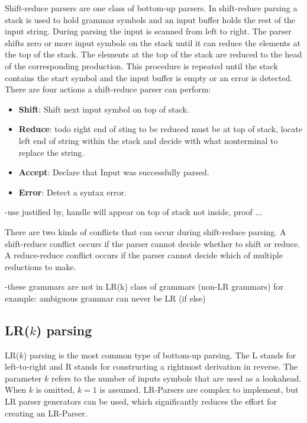 Shift-reduce parsers are one class of bottom-up parsers. In shift-reduce parsing a stack is used to hold grammar symbols and an input buffer holds the rest of the input string.
During parsing the input is scanned from left to right. The parser shifts zero or more input symbols on the stack until it can reduce the elements at the top of the stack. The elements at the top of the stack are reduced to the head of the corresponding production. This procedure is repeated until the stack contains the start symbol and the input buffer is empty or an error is detected. \cite{Aho.2007}\\
There are four actions a shift-reduce parser can perform:
\begin{itemize}%
	\item \textbf{Shift}: Shift next input symbol on top of stack.
	\item \textbf{Reduce}: todo right end of sting to be reduced must be at top of stack, locate left end of string within the stack and decide with what nonterminal to replace the string.
	\item \textbf{Accept}: Declare that Input was successfully parsed.
	\item \textbf{Error}: Detect a syntax error.
\end{itemize}
\cite{Aho.2007}

-use justified by, handle will appear on top of stack not inside, proof ...

There are two kinds of conflicts that can occur during shift-reduce parsing. A shift-reduce conflict occurs if the parser cannot decide whether to shift or reduce.
A reduce-reduce conflict occurs if the parser cannot decide which of multiple reductions to make.

-these grammars are not in LR(k) class of grammars (non-LR grammars)
for example: ambiguous grammar can never be LR (if else)
\cite{Aho.2007}

\subsection{LR($k$) parsing}\label{sec:BackgroundParserLR}

LR($k$) parsing is the most common type of bottom-up parsing. The L stands for left-to-right and R stands for constructing a rightmost derivation in reverse. The parameter $k$ refers to the number of inputs symbols that are used as a lookahead. When $k$ is omitted, $k = 1$ is assumed.
LR-Parsers are complex to implement, but LR parser generators can be used, which significantly reduces the effort for creating an LR-Parser.

